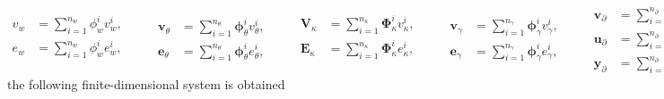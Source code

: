 \begin{equation}\label{eq:approx_vebMin}
\begin{aligned}
v_w &= \sum_{i = 1}^{n_w} \phi_w^i v_w^i, \\
e_w &= \sum_{i = 1}^{n_w} \phi_w^i e_w^i, \\
\end{aligned} \qquad
\begin{aligned}
\bm{v}_\theta &= \sum_{i = 1}^{n_\theta} \bm\phi_\theta^i v_\theta^i, \\
\bm{e}_\theta &= \sum_{i = 1}^{n_\theta} \bm\phi_\theta^i e_\theta^i,
\end{aligned} \qquad
\begin{aligned}
\bm{V}_\kappa &= \sum_{i = 1}^{n_\kappa} \bm\Phi_\kappa^i v_\kappa^i, \\
\bm{E}_\kappa &= \sum_{i = 1}^{n_\kappa} \bm\Phi_\kappa^i e_\kappa^i, \\
\end{aligned} \qquad
\begin{aligned}
\bm{v}_\gamma &= \sum_{i = 1}^{n_\gamma} \bm\phi_\gamma^i v_\gamma^i, \\
\bm{e}_\gamma &= \sum_{i = 1}^{n_\gamma} \bm\phi_\gamma^i e_\gamma^i,
\end{aligned} \qquad
\begin{aligned}
\bm{v}_\partial &= \sum_{i = 1}^{n_\partial} \bm\phi_\partial^i v_\partial^i, \\
\bm{u}_\partial &= \sum_{i = 1}^{n_\partial} \bm\phi_\partial^i u_\partial^i, \\
\bm{y}_\partial &= \sum_{i = 1}^{n_\partial} \bm\phi_\partial^i y_\partial^i.
\end{aligned}
\end{equation} 
the following finite-dimensional system is obtained
